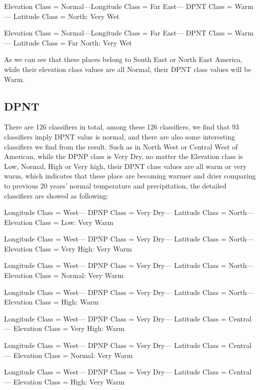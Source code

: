 \documentclass[11pt]{article}
\begin{document}
Elevation Class = Normal---Longitude Class = Far East--- DPNT Class = Warm--- Latitude Class = North:  Very Wet

Elevation Class = Normal---Longitude Class = Far East--- DPNT Class = Warm--- Latitude Class = Far North:  Very Wet

As we can see that these places belong to South East or North East America, while their elevation class values are all Normal, their DPNT class values will be Warm.

\subsection{DPNT}

There are 126 classifiers in total, among these 126 classifiers, we find that 93 classifiers imply DPNT value is normal, and there are also some interesting classifiers we find from the result. Such as in North West or Central West of American, while the DPNP class is Very Dry, no matter the Elevation class is Low, Normal, High or Very high, their DPNT class values are all warm or very warm, which indicates that these place are becoming warmer and drier comparing to previous 20 years’ normal temperature and precipitation, the detailed classifiers are showed as following:

Longitude Class = West--- DPNP Class = Very Dry--- Latitude Class = North--- Elevation Class = Low:  Very Warm

Longitude Class = West--- DPNP Class = Very Dry--- Latitude Class = North--- Elevation Class = Very High:  Very Warm

Longitude Class = West--- DPNP Class = Very Dry--- Latitude Class = North--- Elevation Class = Normal:  Very Warm

Longitude Class = West--- DPNP Class = Very Dry--- Latitude Class = North--- Elevation Class = High:  Warm

Longitude Class = West--- DPNP Class = Very Dry--- Latitude Class = Central--- Elevation Class = Very High:  Warm

Longitude Class = West--- DPNP Class = Very Dry--- Latitude Class = Central--- Elevation Class = Normal:  Very Warm

Longitude Class = West--- DPNP Class = Very Dry--- Latitude Class = Central--- Elevation Class = High:  Very Warm
\end{document}
